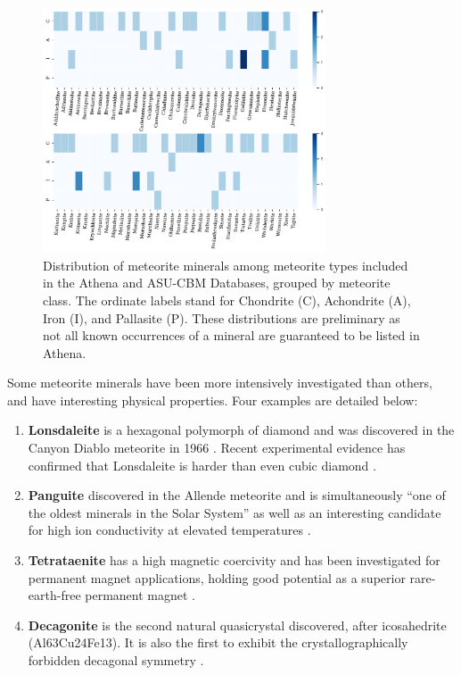 \documentclass[]{aastex63}
\begin{document}
\begin{figure}
    \centering
    \includegraphics[width=0.75\textwidth]{mineral_dist.pdf}
    \caption{Distribution of meteorite minerals among meteorite types included in the Athena and ASU-CBM Databases, grouped by meteorite class. The ordinate labels stand for Chondrite (C), Achondrite (A), Iron (I), and Pallasite (P). These distributions are preliminary as not all known occurrences of a mineral are guaranteed to be listed in Athena.}
    \label{fig:mineralDist}
\end{figure}


Some meteorite minerals have been more intensively investigated than others, and have interesting physical properties. Four examples are detailed below: 

\begin{enumerate}
    \item \textbf{Lonsdaleite} is a hexagonal polymorph of diamond and was discovered in the Canyon Diablo meteorite in 1966 \citep{FRONDEL1967}. Recent experimental evidence has confirmed that Lonsdaleite is harder than even cubic diamond \citep{VolzandGupta}. 
    \item \textbf{Panguite} discovered in the Allende meteorite and is simultaneously ``one of the oldest minerals in the Solar System” as well as an interesting candidate for high ion conductivity at elevated temperatures \citep{Ma2012}. 
    \item \textbf{Tetrataenite} has a high magnetic coercivity and has been investigated for permanent magnet applications, holding good potential as a superior rare-earth-free permanent magnet \citep{Lewis2014}.
    \item \textbf{Decagonite} is the second natural quasicrystal discovered, after icosahedrite (Al63Cu24Fe13). It is also the first to exhibit the crystallographically forbidden decagonal symmetry \citep{Bindi2015}.
\end{enumerate}
\end{document}
